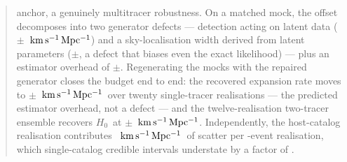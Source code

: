 \documentclass[twocolumn]{aastex631}
\newcommand{\kmsmpc}{\ensuremath{{\rm km\,s^{-1}\,Mpc^{-1}}}}
\newcommand{\Hz}{\ensuremath{H_0}}
\begin{document}
\begin{abstract}
anchor, a genuinely multitracer robustness. On a matched mock, the offset
decomposes into two generator defects --- detection acting on latent data
(\AbDiffMean$\pm$\AbDiffSem~\kmsmpc) and a sky-localisation width derived from
latent parameters (\OrcExactOff$\pm$\OrcExactSem, a defect that biases even
the exact likelihood) --- plus an estimator overhead of
\OrcPairedOff$\pm$\OrcPairedSem. Regenerating the mocks with the repaired
generator closes the budget end to end: the recovered expansion rate moves to
\CloFixMean$\pm$\CloFixSem~\kmsmpc\ over twenty single-tracer realisations ---
the predicted estimator overhead, not a defect --- and the twelve-realisation
two-tracer ensemble recovers \Hz\ at
\SdsFixHzeroOffset$\pm$\SdsFixHzeroSem~\kmsmpc. Independently, the
host-catalog realisation contributes \CloCatalogVariance~\kmsmpc\ of scatter per
\GlassNobs-event realisation, which single-catalog credible intervals understate
by a factor of \CloSeedUnderFactor.
\end{abstract}















\end{document}
